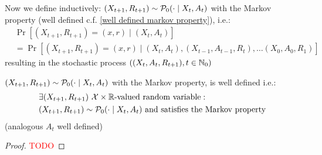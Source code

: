 Now we define inductively: \((X_{t+1}, R_{t+1})\sim\mathcal{P}_0(\cdot\mid X_t, A_t)\) with the Markov property (well defined c.f. \ref{well defined markov property}), i.e.:
\begin{align}
\label{X,R Markov}
	&\Pr[(X_{t+1}, R_{t+1})=(x,r)\mid (X_t,A_t)]\\
	&=\Pr[(X_{t+1},R_{t+1})=(x,r) \mid (X_t,A_t),(X_{t-1},A_{t-1},R_t), 
	\dots (X_0,A_0,R_1)] \nonumber
\end{align}
resulting in the stochastic process \(((X_t,A_t,R_{t+1}), t\in \mathbb{N}_0)\)
\begin{remark}\label{well defined markov property}
	\((X_{t+1}, R_{t+1})\sim\mathcal{P}_0(\cdot\mid X_t, A_t)\) with the Markov property, is well defined i.e.:
	\begin{align*}
		&\exists (X_{t+1}, R_{t+1})\ \mathcal{X}\times\mathbb{R}\text{-valued random variable}: \\ 
		&(X_{t+1}, R_{t+1})\sim\mathcal{P}_0(\cdot\mid X_t, A_t) \text{ and satisfies the Markov property}
	\end{align*}
	(analogous \(A_t\) well defined)
\end{remark}
\begin{proof}
	\textcolor{red}{TODO}
\end{proof}



